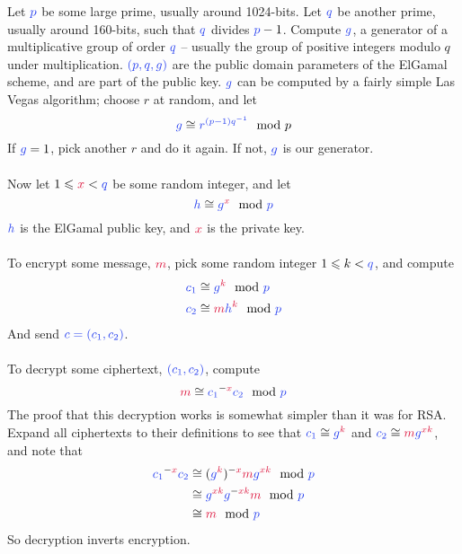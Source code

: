	Let $\blue{p}$ be some large prime, usually around 1024-bits. Let $\blue{q}$ be another prime, usually around 160-bits, such that $\blue{q}$ divides $\blue{p}-1$. Compute $\blue{g}$, a generator of a multiplicative group of order $\blue{q}$ -- usually the group of positive integers modulo $q$ under multiplication. $\blue{(p,q,g)}$ are the public domain parameters of the ElGamal scheme, and are part of the public key. $\blue{g}$ can be computed by a fairly simple Las Vegas algorithm; choose $r$ at random, and let
	$$
		\blue{g} \cong \blue{r^{(p-1)q^{-1}}} \mod p
	$$
	If $\blue{g} = 1$, pick another $r$ and do it again. If not, $\blue{g}$ is our generator.\\
\\
	Now let $1 \leqslant \red{x} < \blue{q}$ be some random integer, and let
	$$
		\blue{h} \cong \blue{g}^\red{x} \mod \blue{p}
	$$
	$\blue{h}$ is the ElGamal public key, and $\red{x}$ is the private key.\\
\\
	To encrypt some message, $\red{m}$, pick some random integer $1 \leqslant k < \blue{q}$, and compute
	\begin{align*}
		\blue{c_1} &\cong \blue{g}^\red{k} \mod \blue{p}\\
		\blue{c_2} &\cong \red{m}\blue{h}^\red{k} \mod \blue{p}
	\end{align*}
	And send $\blue{c = (c_1,c_2)}$.\\
\\
	To decrypt some ciphertext, $\blue{(c_1,c_2)}$, compute
	$$
		\red{m} \cong \blue{c_1}^{-\red{x}}\blue{c_2} \mod \blue{p}
	$$
	The proof that this decryption works is somewhat simpler than it was for RSA. Expand all ciphertexts to their definitions to see that $\blue{c_1} \cong \blue{g}^\red{k}$ and $\blue{c_2} \cong \red{m}\blue{g}^{\red{xk}}$, and note that
	\begin{align*}
		 \blue{c_1}^{-\red{x}}\blue{c_2}
	&\cong (\blue{g}^\red{k})^{-\red{x}}\red{m}\blue{g}^\red{xk} \mod \blue{p} \\
	&\cong \blue{g}^{\red{xk}}\blue{g}^{-\red{xk}}\red{m} \mod \blue{p} \\
	&\cong \red{m} \mod \blue{p}
	\end{align*}
	So decryption inverts encryption.\\\vspace{5mm}
\\
